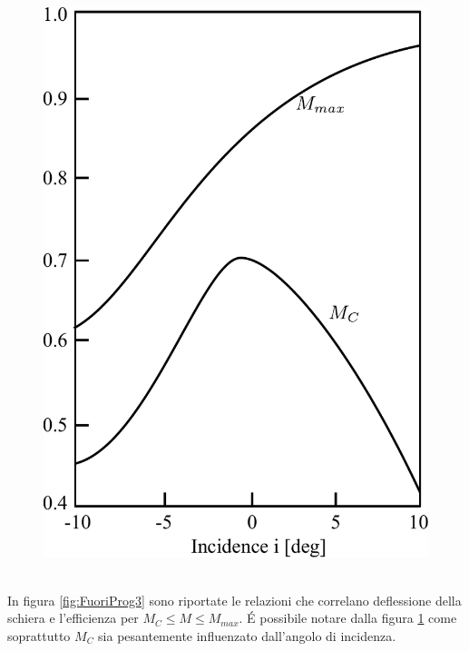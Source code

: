 \begin{figure}[h!]
\begin{minipage}{.4\textwidth}
		\includegraphics[width=\linewidth]{fig/FuoriProg4.pdf}
		\label{fig:FuoriProg4}
	\end{minipage}
\end{figure}
\\In figura \ref{fig:FuoriProg3} sono riportate le relazioni che correlano deflessione della schiera e l'efficienza per $M_C\leq M\leq M_{max}$. \'E possibile notare dalla figura \ref{fig:FuoriProg4} come soprattutto $M_C$ sia pesantemente influenzato dall'angolo di incidenza.

